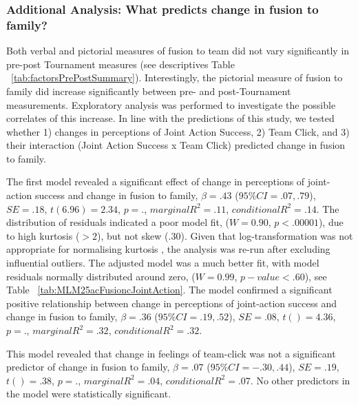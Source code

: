 \subsubsection{Additional Analysis: What predicts change in fusion to family?}
Both verbal and pictorial measures of fusion to team did not vary significantly in pre-post Tournament measures (see descriptives Table ~\ref{tab:factorsPrePostSummary}).  Interestingly, the pictorial measure of fusion to family did increase significantly between pre- and post-Tournament measurements.  Exploratory analysis was performed to investigate the possible correlates of this increase. In line with the predictions of this study, we tested whether 1) changes in perceptions of Joint Action Success, 2) Team Click, and 3) their interaction (Joint Action Success x Team Click) predicted change in fusion to family.

The first model revealed a significant effect of change in perceptions of joint-action success and change in fusion to family, $\beta = .43$ ($95\% CI =  .07, .79$), $SE = .18$, $t(6.96) = 2.34$, $p = .$, $marginal R^2 = .11$, $conditional R^2 = .14$.  The distribution of residuals indicated a poor model fit, ($W = 0.90$, $p < .00001$), due to high kurtosis ($> 2$), but not skew (.30). Given that log-transformation was not appropriate for normalising kurtosis \citep{Glass1972}, the analysis was re-run after excluding influential outliers.  The adjusted model was a much better fit, with model residuals normally distributed around zero, ($W = 0.99$, $p-value < .60$), see Table ~\ref{tab:MLM25acFusioncJointAction}. The model confirmed a significant positive relationship between change in perceptions of joint-action success and change in fusion to family, $\beta = .36$ ($95\% CI =  .19, .52$), $SE = .08$, $t() = 4.36$, $p = .$, $marginal R^2 = .32$, $conditional R^2 = .32$.




This model revealed that change in feelings of team-click was not a significant predictor of change in fusion to family, $\beta = .07$ ($95\% CI =  -.30, .44$), $SE = .19$, $t() = .38$, $p = .$, $marginal R^2 = .04$, $conditional R^2 = .07$. No other predictors in the model were statistically significant.

